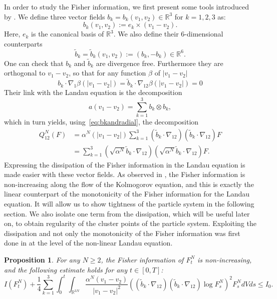 \documentclass[11pt,a4paper]{article}
\theoremstyle{definition}
\theoremstyle{plain}
\newtheorem{prop}[defi]{Proposition}
\begin{document}
In order to study the Fisher information, we first present some tools introduced by \cite{GuillenSilvestre2023}.
We define three vector fields $b_k=b_k(v_1,v_2)\in\mathbb{R}^3$ for $k=1,2,3$ as:
$$b_k(v_1,v_2):=e_k \times (v_1-v_2).$$
Here, $e_k$ is the canonical basis of $\mathbb{R}^3$.
We also define their $6$-dimensional counterparts
$$\tilde{b}_k=\tilde{b}_k(v_1,v_2):=(b_k,-b_k) \in \mathbb{R}^6.$$
One can check that $b_k$ and $\tilde{b}_k$ are divergence free. Furthermore they are orthogonal to $v_1-v_2$, so that for any function $\beta$ of $\vert v_1-v_2\vert$
\begin{equation}
\label{eq:bkandradial}
b_k\cdot\nabla_1 \beta(\vert v_1-v_2\vert) = \tilde{b}_k\cdot\nabla_{12} \beta(\vert v_1-v_2\vert)=0
\end{equation}
Their link with the Landau equation is the decomposition
$$a(v_1-v_2)=\sum_{k=1}^3 b_k\otimes b_k,$$
which in turn yields, using~\eqref{eq:bkandradial}, the decomposition
\begin{align}
\label{eq:decompQinQk}
Q^N_{12}(F)&=\alpha^N(\vert v_1-v_2\vert) \sum_{k=1}^3 (\tilde{b}_k\cdot \nabla_{12})(\tilde{b}_k\cdot \nabla_{12})F\\
&=\sum_{k=1}^3 \left(\sqrt{\alpha^N}\tilde{b}_k\cdot \nabla_{12}\right)\left(\sqrt{\alpha^N}\tilde{b}_k\cdot \nabla_{12}\right)F.\nonumber
\end{align}
Expressing the dissipation of the Fisher information in the Landau equation is made easier with these vector fields.
As observed in \cite{CarrilloGuo2025}, the Fisher information is non-increasing along the flow of the Kolmogorov equation, and this is exactly the linear counterpart of the monotonicity of the Fisher information for the Landau equation. It will allow us to show tightness of the particle system in the following section. We also isolate one term from the dissipation, which will be useful later on, to obtain regularity of the cluster points of the particle system. Exploiting the dissipation and not only the monotonicity of the Fisher information was first done in \cite{Ji2024} at the level of the non-linear Landau equation.
\begin{prop}
\label{prop:fisher_dissipation}
      For any $N\geq 2$, the Fisher information of $F^N_t$ is non-increasing, and the following estimate holds for any $t\in[0,T]$:
      \begin{equation}
      \label{eq:fisher_dissipation}
          I(F^N_t) +\frac{1}{4}\sum_{k=1}^3 \int_0^t \int_{\mathbb{R}^{3N}} \frac{\alpha^N(v_1-v_2)}{\vert v_1-v_2 \vert^2} \left( (\tilde{b}_k\cdot \nabla_{12})( \tilde{b}_k\cdot \nabla_{12})\log F^N_s \right)^2 F^N_s dV ds\leq I_0.
      \end{equation}
\end{prop}
\end{document}
